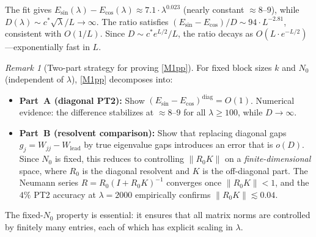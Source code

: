 \documentclass[12pt,a4paper]{article}
\theoremstyle{definition}
\theoremstyle{remark}
\newtheorem{remark}[theorem]{Remark}
\begin{document}
\noindent The fit gives $E_{\sin}(\lambda) - E_{\cos}(\lambda) \approx 7.1\cdot\lambda^{0.023}$ (nearly constant $\approx 8$--$9$), while $D(\lambda) \sim c^*\sqrt{\lambda}/L \to \infty$. The ratio satisfies $(E_{\sin} - E_{\cos})/D \sim 94\cdot L^{-2.81}$, consistent with $O(1/L)$. Since $D \sim c^* e^{L/2}/L$, the ratio decays as $O(L\cdot e^{-L/2})$---exponentially fast in $L$.

\begin{remark}[Two-part strategy for proving \ref{M1pp}]
\label{rem:two-parts}
For fixed block sizes $k$ and $N_0$ (independent of $\lambda$), \ref{M1pp} decomposes into:
\begin{itemize}
  \item \textbf{Part~A (diagonal PT2):} Show $(E_{\sin} - E_{\cos})^{\mathrm{diag}} = O(1)$. Numerical evidence: the difference stabilizes at $\approx 8$--$9$ for all $\lambda \geq 100$, while $D \to \infty$.
  \item \textbf{Part~B (resolvent comparison):} Show that replacing diagonal gaps $g_j = W_{jj} - W_{\mathrm{lead}}$ by true eigenvalue gaps introduces an error that is $o(D)$. Since $N_0$ is fixed, this reduces to controlling $\|R_0 K\|$ on a \emph{finite-dimensional} space, where $R_0$ is the diagonal resolvent and $K$ is the off-diagonal part. The Neumann series $R = R_0(I + R_0 K)^{-1}$ converges once $\|R_0 K\| < 1$, and the $4\%$ PT2 accuracy at $\lambda = 2000$ empirically confirms $\|R_0 K\| \lesssim 0.04$.
\end{itemize}
The fixed-$N_0$ property is essential: it ensures that all matrix norms are controlled by finitely many entries, each of which has explicit scaling in $\lambda$.
\end{remark}
\end{document}
